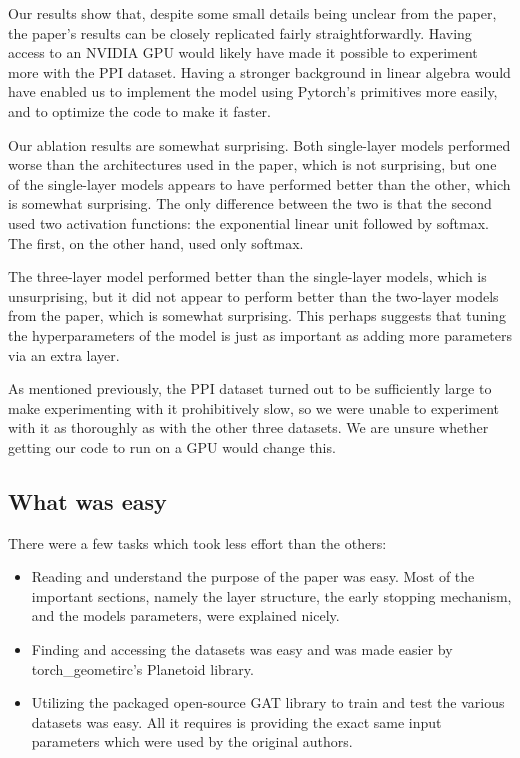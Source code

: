 Our results show that, despite some small details being unclear from the
paper, the paper's results can be closely replicated fairly
straightforwardly. Having access to an NVIDIA GPU would likely have made
it possible to experiment more with the PPI dataset. Having a stronger
background in linear algebra would have enabled us to implement the model
using Pytorch's primitives more easily, and to optimize the code to make it
faster.

Our ablation results are somewhat surprising. Both single-layer models
performed worse than the architectures used in the paper, which is not
surprising, but one of the single-layer models appears to have performed
better than the other, which is somewhat surprising. The only difference
between the two is that the second used two activation functions: the
exponential linear unit followed by softmax. The first, on the other hand, used
only softmax.

The three-layer model performed better than the single-layer models, which is
unsurprising, but it did not appear to perform better than the two-layer models
from the paper, which is somewhat surprising. This perhaps suggests that tuning
the hyperparameters of the model is just as important as adding more parameters
via an extra layer.

As mentioned previously, the PPI dataset turned out to be sufficiently
large to make experimenting with it prohibitively slow, so we were unable
to experiment with it as thoroughly as with the other three datasets. We
are unsure whether getting our code to run on a GPU would change this.

\subsection{What was easy}\label{subsec:what-was-easy}
There were a few tasks which took less effort than the others:
\begin{itemize}
    \item Reading and understand the purpose of the paper was easy. Most of the important sections,
    namely the layer structure, the early stopping mechanism, and the models parameters, were explained nicely.
    \item Finding and accessing the datasets was easy and was made easier by torch\_geometirc's Planetoid library.
    \item Utilizing the packaged open-source GAT library to train and test the various datasets was easy.
    All it requires is providing the exact same input parameters which were used by the original authors.
\end{itemize}


